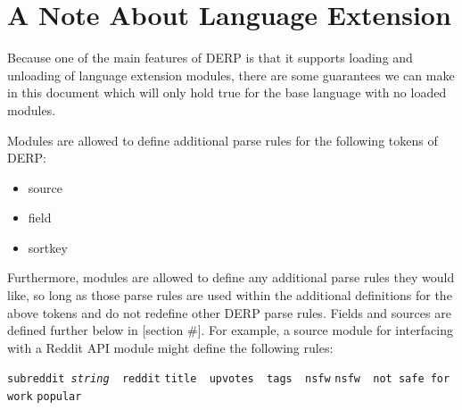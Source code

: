 \section{A Note About Language Extension}
Because one of the main features of DERP is that it supports loading and unloading
of language extension modules, there are some guarantees we can make in this document
which will only hold true for the base language with no loaded modules.

Modules are allowed to define additional parse rules for the following tokens of DERP:
\begin{itemize}
\item source
\item field
\item sortkey
\end{itemize}
Furthermore, modules are allowed to define any additional parse rules they would like, so
long as those parse rules are used within the additional definitions for the above tokens
and do not redefine other DERP parse rules. Fields and sources are defined further below in [section \#].
For example, a source module for interfacing with a Reddit API module might define the following rules:
\begin{description}[labelindent=1cm,leftmargin=\onelen,labelwidth=1cm]
     \texttt{subreddit \textit{string} \textbf{\textbar} reddit}
     \texttt{title \textbf{\textbar} upvotes \textbf{\textbar} tags \textbf{\textbar} nsfw}
     \texttt{nsfw \textbf{\textbar} not safe for work}
     \texttt{popular}
\end{description}
